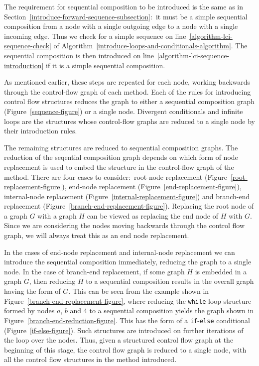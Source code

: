 The requirement for sequential composition to be introduced is the
same as in Section~\ref{introduce-forward-sequence-subsection}:~it
must be a simple sequential composition from a node with a single
outgoing edge to a node with a single incoming edge.
Thus we check for a simple sequence on
line~\ref{algorithm-lci-sequence-check} of
Algorithm~\ref{introduce-loops-and-conditionals-algorithm}.
The sequential composition is then introduced on
line~\ref{algorithm-lci-sequence-introduction} if it is a simple
sequential composition.

As mentioned earlier, these steps are repeated for each node, working
backwards through the control-flow graph of each method.
Each of the rules for introducing control flow structures reduces the
graph to either a sequential composition graph
(Figure~\ref{sequence-figure}) or a single node.
Divergent conditionals and infinite loops are the structures whose
control-flow graphs are reduced to a single node by their introduction
rules.

The remaining structures are reduced to sequential composition graphs.
The reduction of the seqential composition graph depends on which form
of node replacement is used to embed the structure in the control-flow
graph of the method.
There are four cases to consider:~root-node replacement
(Figure~\ref{root-replacement-figure}), end-node replacement
(Figure~\ref{end-replacement-figure}), internal-node replacement
(Figure~\ref{internal-replacement-figure}) and branch-end replacement
(Figure~\ref{branch-end-replacement-figure}).
Replacing the root node of a
graph $G$ with a graph $H$ can be viewed as replacing the end node of
$H$ with $G$.
Since we are considering the nodes moving backwards through the
control flow graph, we will always treat this as an end node
replacement.

In the cases of end-node replacement and internal-node replacement we
can introduce the sequential composition immediately, reducing the
graph to a single node.
In the case of branch-end replacement, if some graph $H$ is embedded
in a graph $G$, then reducing $H$ to a sequential composition results
in the overall graph having the form of $G$.
This can be seen from the example shown in
Figure~\ref{branch-end-replacement-figure}, where reducing the
\texttt{while} loop structure formed by nodes $a$, $b$ and $4$ to a
sequential composition yields the graph shown in
Figure~\ref{branch-end-reduction-figure}.
This has the form of a \texttt{if}-\texttt{else} conditional
(Figure~\ref{if-else-figure}).
Such structures are introduced on further iterations of the loop over
the nodes.
Thus, given a structured control flow graph at the beginning of this
stage, the control flow graph is reduced to a single node, with all
the control flow structures in the method introduced.

